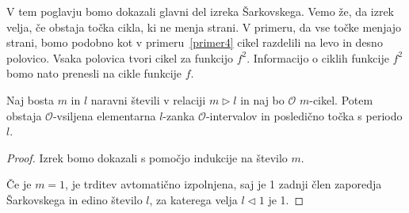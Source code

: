 \documentclass[../TG_magistrsko_delo_sections.tex]{subfiles}
\begin{document}
V tem poglavju bomo dokazali glavni del izreka Šarkovskega. Vemo že, da izrek velja, če obstaja točka cikla, ki ne menja strani. V primeru, da vse točke menjajo strani, bomo podobno kot v primeru~\ref{primer4} cikel razdelili na levo in desno polovico. Vsaka polovica tvori cikel za funkcijo $f^2$. Informacijo o ciklih funkcije $f^2$ bomo nato prenesli na cikle funkcije $f$.

\begin{trditev}\label{trd:realcvtm}
Naj bosta $m$ in $l$ naravni števili v relaciji $m \triangleright l$ in naj bo $\mathcal{O}$ $m$-cikel. Potem obstaja $\mathcal{O}$-vsiljena elementarna $l$-zanka $\mathcal{O}$-intervalov in posledično točka s periodo $l$.
\end{trditev}

\begin{proof}
Izrek bomo dokazali s pomočjo indukcije na število $m$. 

Če je $m=1$, je trditev avtomatično izpolnjena, saj je 1 zadnji člen zaporedja Šarkovskega in edino število $l$, za katerega velja $l \triangleleft 1$ je 1. 


\end{proof}
\end{document}

